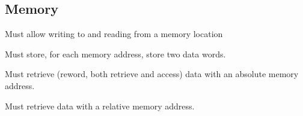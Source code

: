 \subsection{Memory}


\begin{feat-requirement}
Must allow writing to and reading from a memory location
\end{feat-requirement}

\begin{feat-requirement}
Must store, for each memory address, store two data words. 
\end{feat-requirement}

\begin{feat-requirement}
Must retrieve (reword, both retrieve and access) data with an absolute memory address. 
\end{feat-requirement}

\begin{feat-requirement}
Must retrieve data with a relative memory address. 
\end{feat-requirement}
